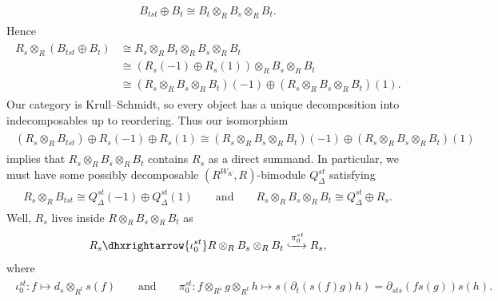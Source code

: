 \begin{example}
\begin{align*}
\begin{split}
B_{tst} \oplus B_t \cong B_t \otimes_R B_s \otimes_R B_t.
\end{split}
\end{align*}
\newpage
\noindent Hence
\begin{align*}
\begin{split}
R_s \otimes_R (B_{tst} \oplus B_t) &\cong R_s \otimes_R B_t \otimes_R B_s \otimes_R B_t\\
&\cong (R_s(-1) \oplus R_s(1)) \otimes_R B_s \otimes_R B_t\\
&\cong (R_s \otimes_R B_s \otimes_R B_t)(-1) \oplus (R_s \otimes_R B_s \otimes_R B_t)(1).
\end{split}
\end{align*}
\noindent Our category is Krull--Schmidt, so every object has a unique decomposition into indecomposables up to reordering. Thus our isomorphism
\begin{align*}
\begin{split}
(R_s \otimes_R B_{tst}) \oplus R_s(-1) \oplus R_s(1) \cong (R_s \otimes_R B_s \otimes_R B_t)(-1) \oplus (R_s \otimes_R B_s \otimes_R B_t)(1)
\end{split}
\end{align*}
\noindent implies that $R_s \otimes_R B_s \otimes_R B_t$ contains $R_s$ as a direct summand. In particular, we must have some possibly decomposable $(R^{W_K}, R)$-bimodule $Q^{st}_\Delta$ satisfying
\begin{align*}
\begin{split}
R_s \otimes_R B_{tst} \cong Q^{st}_\Delta(-1) \oplus Q^{st}_\Delta(1)\qquad\text{and}\qquad R_s \otimes_R B_s \otimes_R B_t \cong Q^{st}_\Delta \oplus R_s.
\end{split}
\end{align*}
\noindent Well, $R_s$ lives inside $R \otimes_R B_s \otimes_R B_t$ as
\begin{align*}
\begin{split}
R_s \dhxrightarrow{\iota^{st}_0} R \otimes_R B_s \otimes_R B_t \xhookrightarrow{\pi^{st}_0} R_s,
\end{split}
\end{align*}
\noindent where
\begin{align*}
\begin{split}
\iota^{st}_0 : f \mapsto d_s \otimes_{R^t} s(f) \qquad\text{and}\qquad\pi^{st}_0 : f \otimes_{R^s} g \otimes_{R^t} h \mapsto s(\partial_t(s(f)g)h) = \partial_{sts}(fs(g))s(h).
\end{split}

\end{align*}
\end{example}
